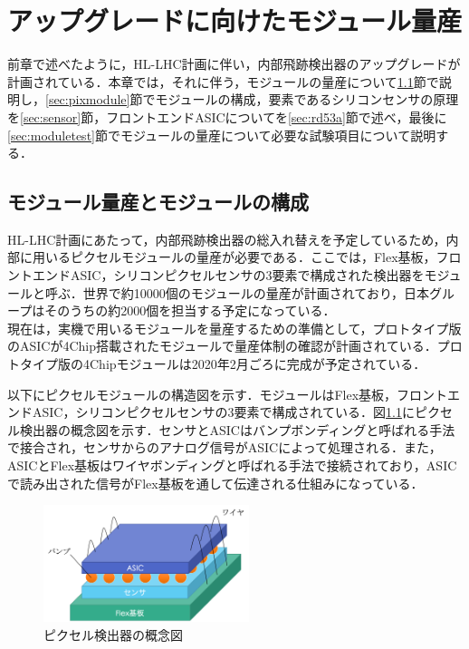 \chapter{アップグレードに向けたモジュール量産}
前章で述べたように，HL-LHC計画に伴い，内部飛跡検出器のアップグレードが計画されている．本章では，それに伴う，モジュールの量産について\ref{sec:masspro}節で説明し，\ref{sec:pixmodule}節でモジュールの構成，要素であるシリコンセンサの原理を\ref{sec:sensor}節，フロントエンドASICについてを\ref{sec:rd53a}節で述べ，最後に\ref{sec:moduletest}節でモジュールの量産について必要な試験項目について説明する．\\

\section{モジュール量産とモジュールの構成}
\label{sec:masspro}
HL-LHC計画にあたって，内部飛跡検出器の総入れ替えを予定しているため，内部に用いるピクセルモジュールの量産が必要である．ここでは，Flex基板，フロントエンドASIC，シリコンピクセルセンサの3要素で構成された検出器をモジュールと呼ぶ．世界で約10000個のモジュールの量産が計画されており，日本グループはそのうちの約2000個を担当する予定になっている．\\
現在は，実機で用いるモジュールを量産するための準備として，プロトタイプ版のASICが4$\mathrm{Chip}$搭載されたモジュールで量産体制の確認が計画されている．プロトタイプ版の4$\mathrm{Chip}$モジュールは2020年2月ごろに完成が予定されている．\par
以下にピクセルモジュールの構造図を示す．モジュールはFlex基板，フロントエンドASIC，シリコンピクセルセンサの3要素で構成されている．図\ref{fig:module}にピクセル検出器の概念図を示す．センサとASICはバンプボンディングと呼ばれる手法で接合され，センサからのアナログ信号がASICによって処理される．また，ASICとFlex基板はワイヤボンディングと呼ばれる手法で接続されており，ASICで読み出された信号がFlex基板を通して伝達される仕組みになっている．\par

\begin{figure}[h]
  \centering
  \includegraphics[width=6cm]{./figure/module.png}
  \caption{ピクセル検出器の概念図}
  \label{fig:module}
\end{figure}

